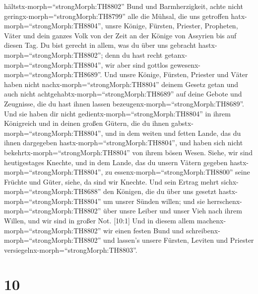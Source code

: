 hältstx-morph=``strongMorph:TH8802'' Bund und Barmherzigkeit, achte
nicht geringx-morph=``strongMorph:TH8799'' alle die Mühsal, die uns
getroffen hatx-morph=``strongMorph:TH8804'', unsre Könige, Fürsten,
Priester, Propheten, Väter und dein ganzes Volk von der Zeit an der
Könige von Assyrien bis auf diesen Tag.  Du bist gerecht in
allem, was du über uns gebracht hastx-morph=``strongMorph:TH8802''; denn
du hast recht getanx-morph=``strongMorph:TH8804'', wir aber sind gottlos
gewesenx-morph=``strongMorph:TH8689''.  Und unsre Könige,
Fürsten, Priester und Väter haben nicht
nachx-morph=``strongMorph:TH8804'' deinem Gesetz getan und auch nicht
achtgehabtx-morph=``strongMorph:TH8689'' auf deine Gebote und Zeugnisse,
die du hast ihnen lassen bezeugenx-morph=``strongMorph:TH8689''.
 Und sie haben dir nicht
gedientx-morph=``strongMorph:TH8804'' in ihrem Königreich und in deinen
großen Gütern, die du ihnen gabstx-morph=``strongMorph:TH8804'', und in
dem weiten und fetten Lande, das du ihnen dargegeben
hastx-morph=``strongMorph:TH8804'', und haben sich nicht
bekehrtx-morph=``strongMorph:TH8804'' von ihrem bösen Wesen.
 Siehe, wir sind heutigestages Knechte, und in dem Lande,
das du unsern Vätern gegeben hastx-morph=``strongMorph:TH8804'', zu
essenx-morph=``strongMorph:TH8800'' seine Früchte und Güter, siehe, da
sind wir Knechte.  Und sein Ertrag mehrt
sichx-morph=``strongMorph:TH8688'' den Königen, die du über uns gesetzt
hastx-morph=``strongMorph:TH8804'' um unsrer Sünden willen; und sie
herrschenx-morph=``strongMorph:TH8802'' über unsre Leiber und unser Vieh
nach ihrem Willen, und wir sind in großer Not.  {[}10:1{]}
Und in diesem allem machenx-morph=``strongMorph:TH8802'' wir einen
festen Bund und schreibenx-morph=``strongMorph:TH8802'' und lassen's
unsere Fürsten, Leviten und Priester
versiegelnx-morph=``strongMorph:TH8803''.

\hypertarget{section-9}{%
\section{10}\label{section-9}}

